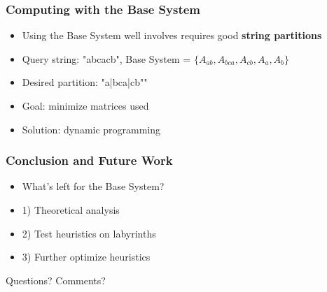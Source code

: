 \documentclass{beamer}
\begin{document}

\begin{frame}
\frametitle{Computing with the Base System}
\begin{itemize}


\item Using the Base System well involves requires good \textbf{string partitions}

\item[] Query string: "abcacb", Base System = $\{A_{ab}, A_{bca}, A_{cb}, A_a, A_b \}$ 


\item[] Desired partition: "a|bca|cb""

\item Goal: minimize matrices used

\item Solution: dynamic programming

\end{itemize}
\end{frame}


\begin{frame}
\frametitle{Conclusion and Future Work}
\begin{itemize}

\item What's left for the Base System?
\item[] 1) Theoretical analysis

\item[] 2) Test heuristics on labyrinths

\item[] 3) Further optimize heuristics


\end{itemize}
\end{frame}


\begin{frame}
\Huge{\centerline{Questions? Comments?}}
\end{frame}





\end{document}

